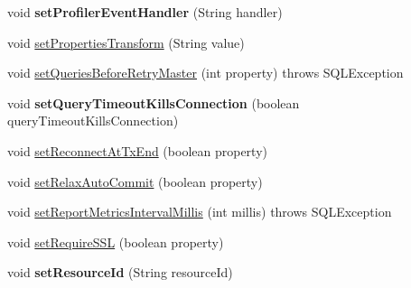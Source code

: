 \begin{DoxyCompactItemize}
\item 
\mbox{\label{classcom_1_1mysql_1_1jdbc_1_1_multi_host_my_s_q_l_connection_af7b811ca885c67e9ad779bc8afffda75}} 
void {\bfseries set\+Profiler\+Event\+Handler} (String handler)
\item 
void \mbox{\hyperlink{classcom_1_1mysql_1_1jdbc_1_1_multi_host_my_s_q_l_connection_ab99171be57dd6ce8597774c664e46136}{set\+Properties\+Transform}} (String value)
\item 
void \mbox{\hyperlink{classcom_1_1mysql_1_1jdbc_1_1_multi_host_my_s_q_l_connection_abb525c1cf46936e3754abab5a8a83997}{set\+Queries\+Before\+Retry\+Master}} (int property)  throws S\+Q\+L\+Exception 
\item 
\mbox{\label{classcom_1_1mysql_1_1jdbc_1_1_multi_host_my_s_q_l_connection_a343995e899b411c1977a6769a2ad19a6}} 
void {\bfseries set\+Query\+Timeout\+Kills\+Connection} (boolean query\+Timeout\+Kills\+Connection)
\item 
void \mbox{\hyperlink{classcom_1_1mysql_1_1jdbc_1_1_multi_host_my_s_q_l_connection_aee7c83d3df1213baf1db90fa072c6262}{set\+Reconnect\+At\+Tx\+End}} (boolean property)
\item 
void \mbox{\hyperlink{classcom_1_1mysql_1_1jdbc_1_1_multi_host_my_s_q_l_connection_adb974ee9a13de24aeadca3f29dc01549}{set\+Relax\+Auto\+Commit}} (boolean property)
\item 
void \mbox{\hyperlink{classcom_1_1mysql_1_1jdbc_1_1_multi_host_my_s_q_l_connection_a5b8ccf72b52a8a23618696f6167bbf89}{set\+Report\+Metrics\+Interval\+Millis}} (int millis)  throws S\+Q\+L\+Exception 
\item 
void \mbox{\hyperlink{classcom_1_1mysql_1_1jdbc_1_1_multi_host_my_s_q_l_connection_a032636f890a49095b4a3574fa21b2ce8}{set\+Require\+S\+SL}} (boolean property)
\item 
\mbox{\label{classcom_1_1mysql_1_1jdbc_1_1_multi_host_my_s_q_l_connection_ac0db4226dd1301d05427a157c5522d45}} 
void {\bfseries set\+Resource\+Id} (String resource\+Id)
\item 
\mbox{\label{classcom_1_1mysql_1_1jdbc_1_1_multi_host_my_s_q_l_connection_a2184429efcca6d1ff0cd9cf4e9a99521}} 

\end{DoxyCompactItemize}
